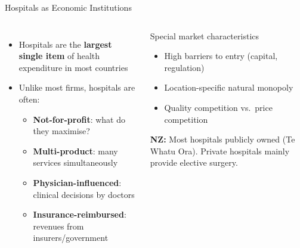 \documentclass[aspectratio=169, 12pt]{beamer}
\begin{document}
\begin{frame}{Hospitals as Economic Institutions}
  \begin{columns}
      \small
      \begin{itemize}
        \item Hospitals are the \textbf{largest single item} of health expenditure in most countries
        \item Unlike most firms, hospitals are often:
        \begin{itemize}
          \item \textbf{Not-for-profit}: what do they maximise?
          \item \textbf{Multi-product}: many services simultaneously
          \item \textbf{Physician-influenced}: clinical decisions by doctors
          \item \textbf{Insurance-reimbursed}: revenues from insurers/government
        \end{itemize}
      \end{itemize}
      \begin{alertblock}{Special market characteristics}
        \small
        \begin{itemize}
          \item High barriers to entry (capital, regulation)
          \item Location-specific natural monopoly
          \item Quality competition vs.\ price competition
        \end{itemize}
        \footnotesize\textbf{NZ:} Most hospitals publicly owned (Te Whatu Ora). Private
        hospitals mainly provide elective surgery.
      \end{alertblock}
  \end{columns}
\end{frame}
\end{document}
